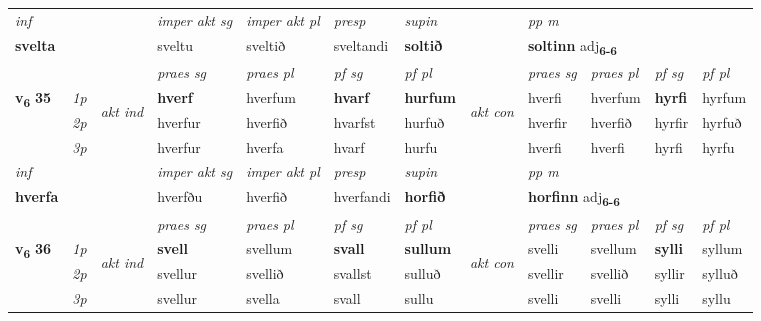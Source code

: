 \begin{longtable}[l]{X>{\footnotesize\itshape}llXXXXlXXXX}
   {\textit{inf}} & &  & \textit{imper akt sg} & \textit{imper akt pl}   & \textit{presp} & \textit{supin}  && \textit{pp m} \\*
  {\textbf{svelta}} & && sveltu  & sveltið   & sveltandi &  \textbf{soltið}  && \multicolumn{2}{l}{\textbf{soltinn} adj\textbf{\textsubscript{6-6}}} \\*

\midrule

 & &   & \textit{praes sg}  & \textit{praes pl}    & \textit{ pf sg} & \textit{pf pl} & & \textit{praes sg}  & \textit{praes pl}    & \textit{pf sg} & \textit{pf pl }  \\ \cmidrule{4-7} \cmidrule{9-12}
 \multirow{2}{*}{{{\textbf{v{\textsubscript{6}}} \Large{\textbf{35}}}}}  & 1p & \multirow{3}{*}{\begin{turn}{90}\textit{akt ind}\end{turn}} & \textbf{hverf} & hverfum & \textbf{hvarf} & \textbf{hurfum} & \multirow{3}{*}{\begin{turn}{90}\textit{akt con}\end{turn}} &hverfi & hverfum & \textbf{hyrfi} & hyrfum\\*
 & 2p &  &  hverfur  & hverfið & hvarfst & hurfuð & & hverfir & hverfið & hyrfir & hyrfuð \\*
 & 3p &  & hverfur & hverfa & hvarf & hurfu & & hverfi & hverfi& hyrfi & hyrfu \\*
\cmidrule{4-7} \cmidrule{9-12}

   {\textit{inf}} & &  & \textit{imper akt sg} & \textit{imper akt pl}   & \textit{presp} & \textit{supin}  && \textit{pp m} \\*
  {\textbf{hverfa}} & && hverfðu  & hverfið   & hverfandi &  \textbf{horfið}  && \multicolumn{2}{l}{\textbf{horfinn} adj\textbf{\textsubscript{6-6}}} \\*

\midrule

 & &   & \textit{praes sg}  & \textit{praes pl}    & \textit{ pf sg} & \textit{pf pl} & & \textit{praes sg}  & \textit{praes pl}    & \textit{pf sg} & \textit{pf pl }  \\ \cmidrule{4-7} \cmidrule{9-12}
 \multirow{2}{*}{{{\textbf{v{\textsubscript{6}}} \Large{\textbf{36}}}}}  & 1p & \multirow{3}{*}{\begin{turn}{90}\textit{akt ind}\end{turn}} & \textbf{svell} & svellum & \textbf{svall} & \textbf{sullum} & \multirow{3}{*}{\begin{turn}{90}\textit{akt con}\end{turn}} &svelli & svellum & \textbf{sylli} & syllum\\*
 & 2p &  &  svellur  & svellið & svallst & sulluð & & svellir & svellið & syllir & sylluð \\*
 & 3p &  & svellur & svella & svall & sullu & & svelli & svelli& sylli & syllu \\*
\cmidrule{4-7} \cmidrule{9-12}


\end{longtable}
